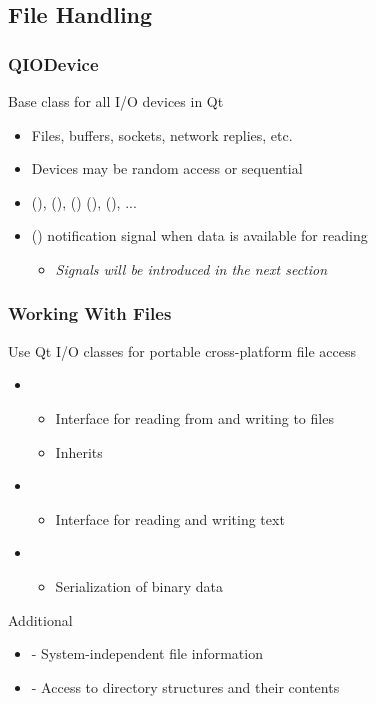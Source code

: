 \subsection{File Handling}


\begin{slide}\frametitle{QIODevice}
  Base class for all I/O devices in Qt
  \begin{itemize}
    \item Files, buffers, sockets, network replies, etc.
    \item Devices may be random access or sequential
    \item {}(), (), () (), (), ...
    \item {}() notification signal when data is available for reading
    \begin{itemize}
    \item \textit{Signals will be introduced in the next section}
    \end{itemize}
  \end{itemize}

\end{slide}


\begin{slide}\frametitle{Working With Files}
  Use Qt I/O classes for portable cross-platform file access
  \begin{itemize}
    \item {}
    \begin{itemize}
      \item Interface for reading from and writing to files
      \item Inherits 
    \end{itemize}
    \item {}
    \begin{itemize}
      \item Interface for reading and writing text
    \end{itemize}
    \item {}
    \begin{itemize}
      \item Serialization of binary data
    \end{itemize}  \end{itemize}
  Additional
  \begin{itemize}
    \item {} - System-independent file information
    \item {} - Access to directory structures and their contents
  \end{itemize}
\end{slide}


